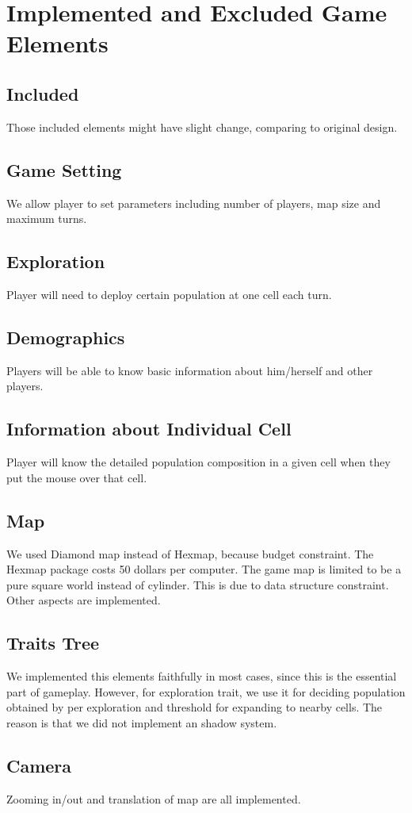 \section{Implemented and Excluded Game Elements}

\subsection{Included}
Those included elements might have slight change, comparing to original design.
\subsection{Game Setting}
We allow player to set parameters including number of players, map size and maximum turns.
\subsection{Exploration}
Player will need to deploy certain population at one cell each turn. 
\subsection{Demographics}
Players will be able to know basic information about him/herself and other players.
\subsection{Information about Individual Cell}
Player will know the detailed population composition in a given cell when they put the mouse over that cell.

	\subsection{Map}
	We used Diamond map instead of Hexmap, because budget constraint. The Hexmap package costs 50 dollars per computer. The game map is limited to be a pure square world instead of cylinder. This is due to data structure constraint. Other aspects are implemented.
	\subsection{Traits Tree}
	We implemented this elements faithfully in most cases, since this is the essential part of gameplay. However, for exploration trait, we use it for deciding population obtained by per exploration and threshold for expanding to nearby cells. The reason is that we did not implement an shadow system.
	\subsection{Camera}
	Zooming in/out and translation of map are all implemented.

